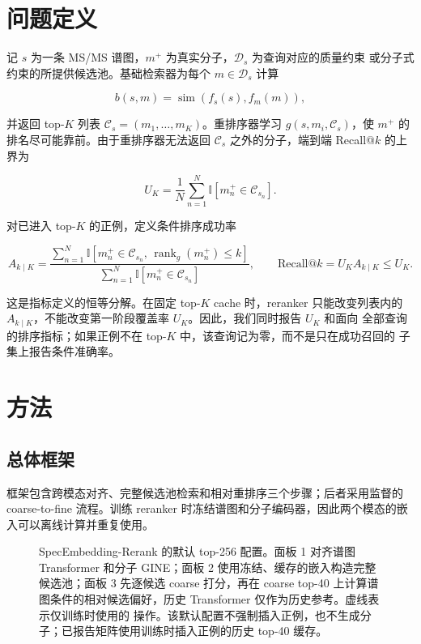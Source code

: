 \documentclass[UTF8,11pt]{ctexart}
\newcommand{\method}{SpecEmbedding-Rerank}
\newcommand{\candidates}{\mathcal{C}}
\begin{document}
\section{问题定义}

记 $s$ 为一条 MS/MS 谱图，$m^+$ 为真实分子，$\mathcal{D}_s$ 为查询对应的质量约束
或分子式约束的所提供候选池。基础检索器为每个 $m\in\mathcal{D}_s$ 计算

\begin{equation}
  b(s,m)=\operatorname{sim}(f_s(s),f_m(m)),
\end{equation}

并返回 top-$K$ 列表 $\candidates_s=(m_1,\ldots,m_K)$。重排序器学习
$g(s,m_i,\candidates_s)$，使 $m^+$ 的排名尽可能靠前。由于重排序器无法返回
$\candidates_s$ 之外的分子，端到端 Recall@$k$ 的上界为

\begin{equation}
  U_K=\frac{1}{N}\sum_{n=1}^{N}
  \mathbb{I}[m_n^+\in\candidates_{s_n}].
  \label{eq:upper_bound_cn}
\end{equation}

对已进入 top-$K$ 的正例，定义条件排序成功率

\begin{equation}
  A_{k\mid K}=
  \frac{\sum_{n=1}^{N}\mathbb{I}[m_n^+\in\candidates_{s_n},\,
  \operatorname{rank}_g(m_n^+)\le k]}
  {\sum_{n=1}^{N}\mathbb{I}[m_n^+\in\candidates_{s_n}]},
  \qquad
  \mathrm{Recall@}k=U_K A_{k\mid K}\le U_K.
  \label{eq:coverage_decomposition_cn}
\end{equation}

这是指标定义的恒等分解。在固定 top-$K$ cache 时，reranker 只能改变列表内的
$A_{k\mid K}$，不能改变第一阶段覆盖率 $U_K$。因此，我们同时报告 $U_K$ 和面向
全部查询的排序指标；如果正例不在 top-$K$ 中，该查询记为零，而不是只在成功召回的
子集上报告条件准确率。

\section{方法}

\subsection{总体框架}

框架包含跨模态对齐、完整候选池检索和相对重排序三个步骤；后者采用监督的 coarse-to-fine
流程。训练 reranker 时冻结谱图和分子编码器，因此两个模态的嵌入可以离线计算并重复使用。

\begin{figure}[t]
  \centering
  
  \caption{\method{} 的默认 top-256 配置。面板 1 对齐谱图 Transformer 和分子 GINE；面板 2
  使用冻结、缓存的嵌入构造完整候选池；面板 3 先逐候选 coarse 打分，再在 coarse top-40
  上计算谱图条件的相对候选偏好，历史 Transformer 仅作为历史参考。虚线表示仅训练时使用的
  操作。该默认配置不强制插入正例，也不生成分子；已报告矩阵使用训练时插入正例的历史
  top-40 缓存。}
  \label{fig:overview_cn}
\end{figure}
\end{document}
